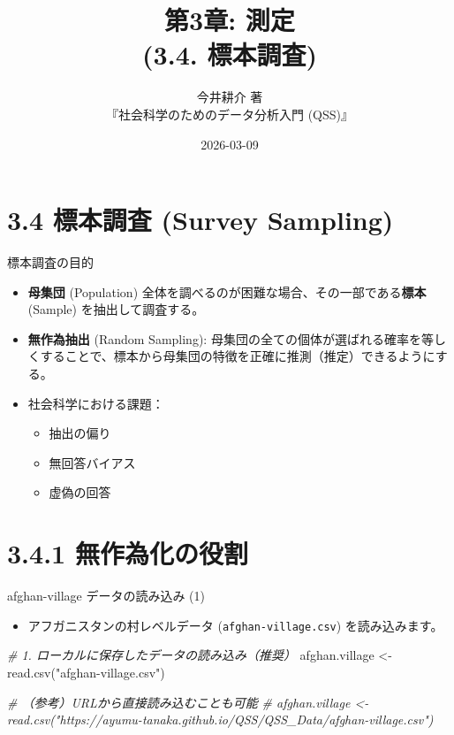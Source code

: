 \documentclass[
  ignorenonframetext,
]{beamer}
\title{第3章: 測定\\
(3.4. 標本調査)}
\subtitle{今井耕介 著\\
『社会科学のためのデータ分析入門 (QSS)』}
\author{}
\date{\vspace{-2.5em}2026-03-09}
\newenvironment{Shaded}{\begin{snugshade}}{\end{snugshade}}
\newcommand{\CommentTok}[1]{\textcolor[rgb]{0.56,0.35,0.01}{\textit{#1}}}
\newcommand{\FunctionTok}[1]{\textcolor[rgb]{0.00,0.00,0.00}{#1}}
\newcommand{\NormalTok}[1]{#1}
\newcommand{\OtherTok}[1]{\textcolor[rgb]{0.56,0.35,0.01}{#1}}
\newcommand{\StringTok}[1]{\textcolor[rgb]{0.31,0.60,0.02}{#1}}
\providecommand{\tightlist}{%
  \setlength{\itemsep}{0pt}\setlength{\parskip}{0pt}}
\begin{document}
\frame{\titlepage}

\hypertarget{ux6a19ux672cux8abfux67fb-survey-sampling}{%
\section{3.4 標本調査 (Survey
Sampling)}\label{ux6a19ux672cux8abfux67fb-survey-sampling}}

\begin{frame}{標本調査の目的}
\protect\hypertarget{ux6a19ux672cux8abfux67fbux306eux76eeux7684}{}
\begin{itemize}
\tightlist
\item
  \textbf{母集団} (Population)
  全体を調べるのが困難な場合、その一部である\textbf{標本} (Sample)
  を抽出して調査する。
\item
  \textbf{無作為抽出} (Random Sampling):
  母集団の全ての個体が選ばれる確率を等しくすることで、標本から母集団の特徴を正確に推測（推定）できるようにする。
\item
  社会科学における課題：

  \begin{itemize}
  \tightlist
  \item
    抽出の偏り
  \item
    無回答バイアス
  \item
    虚偽の回答
  \end{itemize}
\end{itemize}
\end{frame}

\hypertarget{ux7121ux4f5cux70baux5316ux306eux5f79ux5272}{%
\section{3.4.1
無作為化の役割}\label{ux7121ux4f5cux70baux5316ux306eux5f79ux5272}}

\begin{frame}[fragile]{afghan-village データの読み込み (1)}
\protect\hypertarget{afghan-village-ux30c7ux30fcux30bfux306eux8aadux307fux8fbcux307f-1}{}
\begin{itemize}
\tightlist
\item
  アフガニスタンの村レベルデータ (\texttt{afghan-village.csv})
  を読み込みます。
\end{itemize}

\scriptsize

\begin{Shaded}
\begin{Highlighting}[]
\CommentTok{\# 1. ローカルに保存したデータの読み込み（推奨）}
\NormalTok{afghan.village }\OtherTok{\textless{}{-}} \FunctionTok{read.csv}\NormalTok{(}\StringTok{"afghan{-}village.csv"}\NormalTok{)}

\CommentTok{\# （参考）URLから直接読み込むことも可能}
\CommentTok{\# afghan.village \textless{}{-} read.csv("https://ayumu{-}tanaka.github.io/QSS/QSS\_Data/afghan{-}village.csv")}
\end{Highlighting}
\end{Shaded}

\normalsize
\end{frame}
\end{document}
